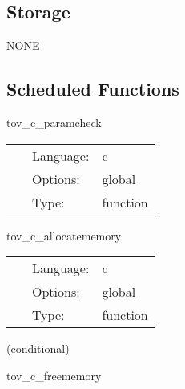 \subsection*{Storage}NONE
\subsection*{Scheduled Functions}
\vspace{5mm}


\hspace{5mm} tov\_c\_paramcheck 

\hspace{5mm}{\it check parameters } 


\hspace{5mm}

 \begin{tabular*}{160mm}{cll} 
~ & Language:  & c \\ 
~ & Options:  & global \\ 
~ & Type:  & function \\ 
\end{tabular*} 


\vspace{5mm}


\hspace{5mm} tov\_c\_allocatememory 

\hspace{5mm}{\it allocate memory for tovsolver\_c } 


\hspace{5mm}

 \begin{tabular*}{160mm}{cll} 
~ & Language:  & c \\ 
~ & Options:  & global \\ 
~ & Type:  & function \\ 
\end{tabular*} 


\vspace{5mm}

   (conditional) 

\hspace{5mm} tov\_c\_freememory 

\hspace{5mm}{\it free memory from tovsolver\_c } 


\hspace{5mm}

